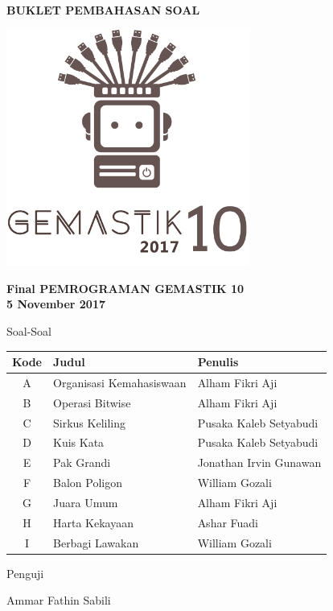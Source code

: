 \documentclass[a4paper]{article}
\begin{document}
\begin{titlepage}
\begin{center}

    \textbf{\huge BUKLET PEMBAHASAN SOAL}
    
    \vspace{1cm} %

    \includegraphics[width=0.6\textwidth]{../gemastiklogo}
    
	\vspace{1cm} %
    
    \textbf{\LARGE Final PEMROGRAMAN GEMASTIK 10}\\[0.5cm]
    \textbf{\LARGE 5 November 2017}

	\vfill
	
	{\Large Soal-Soal}
	
	\def\arraystretch{1.5} %
	\begin{tabular}{|c|l|l|}
		\hline
		\textbf{Kode} & \textbf{Judul} & \textbf{Penulis} \\
		\hline
		A & Organisasi Kemahasiswaan & Alham Fikri Aji \\
		B & Operasi Bitwise & Alham Fikri Aji \\
		C & Sirkus Keliling & Pusaka Kaleb Setyabudi \\
		D & Kuis Kata & Pusaka Kaleb Setyabudi \\
		E & Pak Grandi & Jonathan Irvin Gunawan \\
		F & Balon Poligon & William Gozali \\
		G & Juara Umum & Alham Fikri Aji \\
		H & Harta Kekayaan & Ashar Fuadi \\
		I & Berbagi Lawakan & William Gozali \\
		\hline
	\end{tabular}
	
    \vspace{.3cm}

    {\Large Penguji}

    Ammar Fathin Sabili

\end{center}
\end{titlepage}
\end{document}
